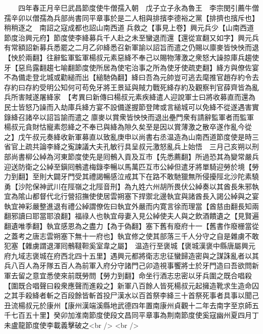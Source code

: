 　　四年春正月辛巳武昌節度使牛僧孺入朝　戊子立子永為魯王　李宗閔引薦牛僧孺辛卯以僧孺為兵部尚書同平章事於是二人相與排擯李德裕之黨【排擠也擯斥也】稍稍逐之　南詔之寇成都也詔山南西道兵救之【事見上卷】興元兵少【山南西道節度治興元府】節度使李絳募兵千人赴之未至蠻退而還【還從宣翻又如字】興元兵有常額詔新募兵悉罷之二月乙卯絳悉召新軍諭以詔旨而遣之仍賜以廪麥皆怏怏而退【怏於兩翻】往辭監軍監軍楊叔元素惡絳不奉己以賜物薄激之衆怒大譟掠庫兵趨使牙【惡烏露翻趨七喻翻節度使所居為使宅治事之所為使牙使疏吏翻】絳方與僚佐宴不為備走登北城或勸縋而出【縋馳偽翻】絳曰吾為元帥豈可逃去麾推官趙存約令去存約曰存約受明公知何可苟免牙將王景延與賊力戰死絳存約及觀察判官薛齊皆為亂兵所害賊遂屠絳家　【考異曰新傳曰楊叔元素疾絳遣人迎說軍士曰將收募直而還為民士皆怒乃譟而入劫庫兵絳方宴不設備遂握節登陴或言縋城可以免絳不從遂遇害實錄絳召諸卒以詔旨諭而遣之廪麥以賞衆皆怏怏而退出壘門衆有請辭監軍者而監軍楊叔元貪財怙寵素怨絳之不奉已與絳為隙久矣至是因以賞薄激之散卒遂作亂今從之】戊午叔元奏絳收新軍募直以致亂庚申以尚書右丞温造為山南西道節度使是時三省官上疏共論李絳之寃諫議大夫孔敏行具呈叔元激怒亂兵上始悟　三月己亥朔以刑部尚書柳公綽為河東節度使先是囘鶻入貢及互市【先悉薦翻】所過恐其為變常嚴兵迎送防衛之公綽至鎭囘鶻遣梅錄李暢以馬萬匹互市公綽但遣牙將單騎迎勞於境【勞力到翻】至則大闢牙門受其禮謁暢感泣戒其下在路不敢馳獵無所侵擾陘北沙陀素驍勇【沙陀保神武川在陘嶺之北陘音刑】為九姓六州胡所畏伏公綽奏以其酋長朱邪執宜為隂山都督代北行營招撫使使居雲朔塞下捍禦北邊執宜與諸酋長入謁公綽與之宴執宜神彩嚴整進退有禮公綽謂僚佐曰執宜外嚴而内寛言徐而理當【酋慈由翻長知兩翻邪讀曰耶當耶浪翻】福祿人也執宜母妻入見公綽使夫人與之飲酒饋遺之【見賢遍翻遺唯季翻】執宜感恩為之盡力【為于偽翻】塞下舊有廢府十一【舊書作廢栅當從之蓋考之唐志雲朔塞下無十一府也】執宜修之使其部落三千人分守之自是雜虜不敢犯塞【雜虜謂退渾囘鶻韃靼奚室韋之屬】　温造行至褒城【褒城漢褒中縣唐屬興元府九域志褒城在府西北四十五里】遇興元都將衛志忠征蠻歸造密與之謀誅亂者以其兵八百人為牙隊五百人為前軍入府分守諸門己卯造視事饗將士於牙門造曰吾欲問新軍去留之意宜悉使來前既勞問【勞力到翻】命坐行酒志忠密以牙兵圍之既合唱殺【圍既合唱聲曰殺衆應聲而進殺之】新軍八百餘人皆死楊叔元起擁造靴求生造命囚之其手殺絳者斬之百段餘皆斬首投尸漢水以百首祭李絳三十首祭死事者具事以聞己丑流楊叔元於康州【康州漢端溪縣地武德四年置南康州貞觀十二年去南字至京師五千七百五十里】癸卯加淮南節度使段文昌同平章事為荆南節度使奚寇幽州夏四月丁未盧龍節度使李載義擊破之<br />
<br />
